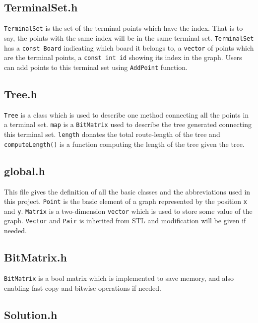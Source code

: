 \documentclass[12pt, a4paper]{article}
\begin{document}
		\subsection{TerminalSet.h}
		
			\texttt{TerminalSet} is the set of the terminal points which have the index. That is to say, the points with the same index will be in the same terminal set. \texttt{TerminalSet} has a \texttt{const Board} indicating which board it belongs to, a \texttt{vector} of points which are the terminal points, a \texttt{const int id} showing its index in the graph. Users can add points to this terminal set using \texttt{AddPoint} function.
				
		\subsection{Tree.h}

			\texttt{Tree} is a class which is used to describe one method connecting all the points in a terminal set. \texttt{map} is a \texttt{BitMatrix} used to describe the tree generated connecting this terminal set. \texttt{length} donates the total route-length of the tree and \texttt{computeLength()} is a function computing the length of the tree given the tree.
		
		\subsection{global.h}

			This file gives the definition of all the basic classes and the abbreviations used in this project. \texttt{Point} is the basic element of a graph represented by the position \texttt{x} and \texttt{y}. \texttt{Matrix} is a two-dimension \texttt{vector} which is used to store some value of the graph. \texttt{Vector} and \texttt{Pair} is inherited from STL and modification will be given if needed.
		
		\subsection{BitMatrix.h}

			\texttt{BitMatrix} is a bool matrix which is implemented to save memory, and also enabling fast copy and bitwise operations if needed.
		
		\subsection{Solution.h}
\end{document}
